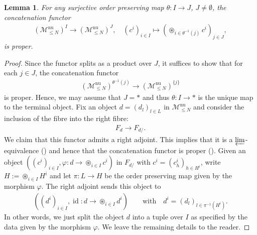 \documentclass[12pt, reqno]{amsart}
\theoremstyle{plain}
\newtheorem{lemma}[theorem]{Lemma}
\theoremstyle{definition}
\renewcommand{\phi}{\varphi}
\begin{document}
\begin{lemma}\label{concatenation functor is proper}
For any surjective order preserving map $\theta\colon I\rightarrow J$, $J\neq \emptyset$, the concatenation functor
\begin{align*}
(\mathscr{M}^{\operatorname{nu}}_{\leq N})^I\rightarrow (\mathscr{M}^{\operatorname{nu}}_{\leq N})^J, \quad (c^i)_{i\in I}\mapsto (\circledast_{i\in \theta^{-1}(j)}c^i)_{j\in J},
\end{align*}
is proper.
\end{lemma}
\begin{proof}
Since the functor splits as a product over $J$, it suffices to show that for each $j\in J$, the concatenation functor
\begin{align*}
(\mathscr{M}_{\leq N}^{\operatorname{nu}})^{\theta^{-1}(j)}\rightarrow (\mathscr{M}_{\leq N}^{\operatorname{nu}})^{\{j\}}
\end{align*}
is proper. Hence, we may assume that $J=\ast$ and thus $\theta\colon I\rightarrow \ast$ is the unique map to the terminal object. Fix an object $d=(d_l)_{l\in L}$ in $\mathscr{M}_{\leq N}^{\operatorname{nu}}$ and consider the inclusion of the fibre into the right fibre:
\begin{align*}
F_d\rightarrow F_{d/}.
\end{align*}
We claim that this functor admits a right adjoint. This implies that it is a $\varprojlim$-equivalence (\cite[Example 2.21]{ClausenOrsnesJansen}) and hence that the concatenation functor is proper (\cite[Definition 2.22]{ClausenOrsnesJansen}). Given an object $((c^i)_{i\in I}, \phi \colon d\rightarrow \circledast_{i\in I}c^i)$ in $F_{d/}$ with $c^i=(c^i_h)_{h\in H^i}$, write $H:=\circledast_{i\in I}H^i$ and let $\pi\colon L\rightarrow H$ be the order preserving map given by the morphism $\phi$. The right adjoint sends this object to
\begin{align*}
((d^i)_{i\in I}, \operatorname{id} \colon d\rightarrow \circledast_{i\in I}d^i)\qquad \text{with} \quad d^i=(d_l)_{l\in \pi^{-1}(H^i)}.
\end{align*}
In other words, we just split the object $d$ into a tuple over $I$ as specified by the data given by the morphism $\phi$. We leave the remaining details to the reader.
\end{proof}
\end{document}
